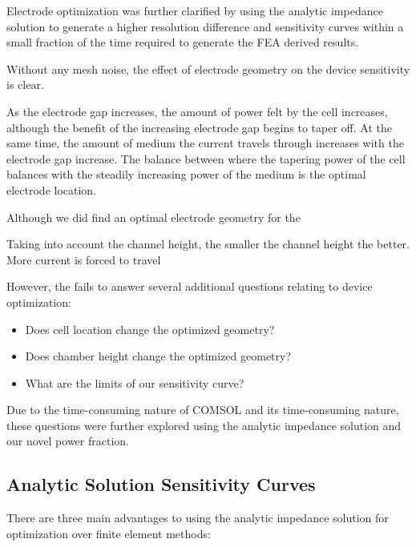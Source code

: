 \par Electrode optimization was further clarified by using the analytic impedance solution to generate a higher resolution difference and sensitivity curves within a small fraction of the time required to generate the FEA derived results. 

\par Without any mesh noise, the effect of electrode geometry on the device sensitivity is clear. 

\par As the electrode gap increases, the amount of power felt by the cell increases, although the benefit of the increasing electrode gap begins to taper off. At the same time, the amount of medium the current travels through increases with the electrode gap increase. The balance between where the tapering power of the cell balances with the steadily increasing power of the medium is the optimal electrode location.

\par Although we did find an optimal electrode geometry for the 

\par Taking into account the channel height, the smaller the channel height the better. More current is forced to travel 

\par However, the fails to answer several additional questions relating to device optimization:
\begin{itemize}
    \item Does cell location change the optimized geometry?
    \item Does chamber height change the optimized geometry?
    \item What are the limits of our sensitivity curve?

\end{itemize}

\par Due to the time-consuming nature of COMSOL and its time-consuming nature, these questions were further explored using the analytic impedance solution and our novel power fraction.

\FloatBarrier
\clearpage

\subsection{Analytic Solution Sensitivity Curves}

\par There are three main advantages to using the analytic impedance solution for optimization over finite element methods:

